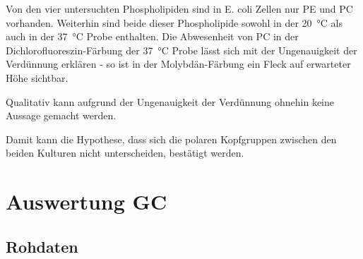 \documentclass[a4paper,english]{scrreprt}
\begin{document}
Von den vier untersuchten Phospholipiden sind in E. coli Zellen nur PE und PC
vorhanden. Weiterhin sind beide dieser Phospholipide sowohl in der
\SI{20}{\celsius} als auch in der \SI{37}{\celsius} Probe enthalten. Die
Abwesenheit von PC in der Dichlorofluoreszin-Färbung der \SI{37}{\celsius}
Probe lässt sich mit der Ungenauigkeit der Verdünnung erklären - so ist in der
Molybdän-Färbung ein Fleck auf erwarteter Höhe sichtbar.

Qualitativ kann aufgrund der Ungenauigkeit der Verdünnung ohnehin keine Aussage
gemacht werden.

Damit kann die Hypothese, dass sich die polaren Kopfgruppen zwischen den beiden
Kulturen nicht unterscheiden, bestätigt werden.

\chapter{Auswertung GC}

\section{Rohdaten}
\end{document}
